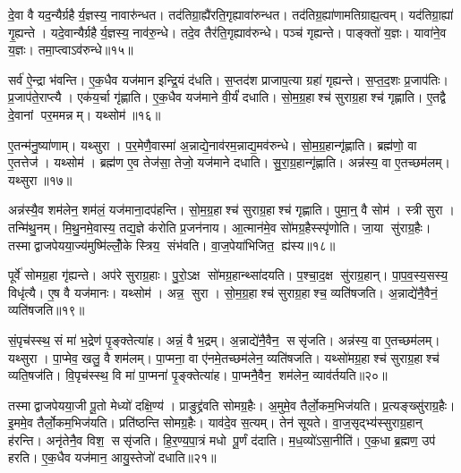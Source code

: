 दे॒वा वै यद॒न्यैर्ग्रहैर्य॒ज्ञस्य॒ नावारु॑न्धत। तद॑तिग्रा॒ह्यै॑रति॒गृह्यावा॑रुन्धत। तद॑तिग्र॒ह्या॑णामतिग्राह्य॒त्वम्। यद॑तिग्रा॒ह्या॑ गृ॒ह्यन्ते। यदे॒वान्यैर्ग्रहैर्य॒ज्ञस्य॒ नाव॑रु॒न्धे। तदे॒व तैर॑ति॒गृह्याव॑रुन्धे। पञ्च॑ गृह्यन्ते। पाङ्क्तो॑ य॒ज्ञः। यावा॑ने॒व य॒ज्ञः। तमा॒प्त्वाऽव॑रुन्धे॥१५॥

सर्व॑ ऐ॒न्द्रा भ॑वन्ति। ए॒क॒धैव यज॑मान इन्द्रि॒यं द॑धति। स॒प्तद॑श प्राजाप॒त्या ग्रहा॑ गृह्यन्ते। स॒प्त॒द॒शः प्र॒जाप॑तिः। प्र॒जाप॑ते॒राप्त्यै। एक॑य॒र्चा गृ॑ह्णाति। ए॒क॒धैव यज॑माने वी॒र्यं॑ दधाति। सो॒म॒ग्र॒हाश्च॑ सुराग्र॒हाश्च॑ गृह्णाति। ए॒तद्वै दे॒वानां पर॒ममन्नम्। यथ्सोम॑॥१६॥

ए॒तन्म॑नु॒ष्या॑णाम्। यथ्सुरा। प॒र॒मेणै॒वास्मा॑ अ॒न्नाद्ये॒नाव॑रम॒न्नाद्य॒मव॑रुन्धे। सो॒म॒ग्र॒हान्गृ॑ह्णाति। ब्रह्म॑णो॒ वा ए॒तत्तेज॑। यथ्सोम॑। ब्रह्म॑ण ए॒व तेज॑सा॒ तेजो॒ यज॑माने दधाति। सु॒रा॒ग्र॒हान्गृ॑ह्णाति। अन्न॑स्य॒ वा ए॒तच्छम॑लम्। यथ्सुरा॥१७॥

अन्न॑स्यै॒व शम॑लेन॒ शम॑लं॒ यज॑माना॒दप॑हन्ति। सो॒म॒ग्र॒हाश्च॑ सुराग्र॒हाश्च॑ गृह्णाति। पुमा॒न्॒ वै सोम॑। स्त्री सुरा। तन्मि॑थु॒नम्। मि॒थु॒नमे॒वास्य॒ तद्य॒ज्ञे क॑रोति प्र॒जन॑नाय। आ॒त्मान॑मे॒व सो॑मग्र॒हैस्स्पृ॑णोति। जा॒या सु॑राग्र॒हैः। तस्माद्वाजपेयया॒ज्य॑मुष्मि॑ल्लोँ॒के स्त्रिय॒ संभ॑वति। वा॒ज॒पेया॑भिजित॒ ह्य॑स्य॥१८॥

पूर्वे॑ सोमग्र॒हा गृ॑ह्यन्ते। अप॑रे सुराग्र॒हाः। पु॒रो॒ऽक्ष सो॑मग्र॒हान्थ्सा॑दयति। प॒श्चा॒द॒क्ष सु॑राग्र॒हान्। पा॒प॒व॒स्य॒सस्य॒ विधृ॑त्यै। ए॒ष वै यज॑मानः। यथ्सोम॑। अन्न॒ सुरा। सो॒म॒ग्र॒हाश्च॑ सुराग्र॒हाश्च॒ व्यति॑षजति। अ॒न्नाद्ये॑नै॒वैनं॒ व्यति॑षजति॥१९॥

सं॒पृच॑स्स्थ॒ सं मा॑ भ॒द्रेण॑ पृ॒ङ्क्तेत्या॑ह। अन्नं॒ वै भ॒द्रम्। अ॒न्नाद्ये॑नै॒वैन॒ ससृ॑जति। अन्न॑स्य॒ वा ए॒तच्छम॑लम्। यथ्सुरा। पा॒प्मेव॒ खलु॒ वै शम॑लम्। पा॒प्मना॒ वा ए॑नमे॒तच्छम॑लेन॒ व्यति॑षजति। यथ्सो॑मग्र॒हाश्च॑ सुराग्र॒हाश्च॑ व्यति॒षज॑ति। वि॒पृच॑स्स्थ॒ वि मा॑ पा॒प्मना॑ पृ॒ङ्क्तेत्या॑ह। पा॒प्मनै॒वैन॒ शम॑लेन॒ व्याव॑र्तयति॥२०॥

तस्माद्वाजपेयया॒जी पू॒तो मेध्यो॑ दक्षि॒ण्य॑। प्राङुद्द्र॑वति सोमग्र॒हैः। अ॒मुमे॒व तैर्लो॒कम॒भिज॑यति। प्र॒त्यङ्ख्सु॑राग्र॒हैः। इ॒ममे॒व तैर्लो॒कम॒भिज॑यति। प्रति॑ष्ठन्ति सोमग्र॒हैः। याव॑दे॒व स॒त्यम्। तेन॑ सूयते। वा॒ज॒सृद्भ्य॑स्सुराग्र॒हान् ह॑रन्ति। अनृ॑तेनै॒व विश॒ ससृ॑जति। हि॒र॒ण्य॒पा॒त्रं मधोपू॒र्णं द॑दाति। म॒ध॒व्यो॑ऽसा॒नीति॑। ए॒क॒धा ब्र॒ह्मण॒ उप॑ हरति। ए॒क॒धैव यज॑मान॒ आयु॒स्तेजो॑ दधाति॥२१॥

